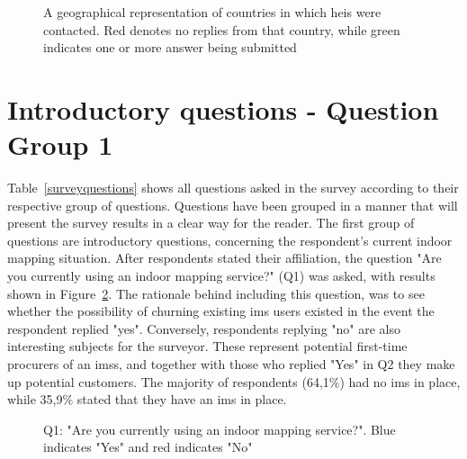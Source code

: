 \begin{figure}
    \centering
    \caption{A geographical representation of countries in which \glspl{hei} were contacted. Red denotes no replies from that country, while green indicates one or more answer being submitted}
    \label{fig:worldmap}
\end{figure}

\section{Introductory questions - Question Group 1}
Table~\ref{surveyquestions} shows all questions asked in the survey according to their respective group of questions. Questions have been grouped in a manner that will present the survey results in a clear way for the reader. The first group of questions are introductory questions, concerning the respondent's current indoor mapping situation. After respondents stated their affiliation, the question "Are you currently using an indoor mapping service?" (Q1) was asked, with results shown in Figure~\ref{fig:q1}. The rationale behind including this question, was to see whether the possibility of churning existing \gls{ims} users existed in the event the respondent replied "yes". Conversely, respondents replying "no" are also interesting subjects for the surveyor. These represent potential first-time procurers of an \glspl{ims}, and together with those who replied "Yes" in Q2 they make up potential customers. The majority of respondents (64,1\%) had no \gls{ims} in place, while 35,9\% stated that they have an \gls{ims} in place. 

\begin{figure}[H]
    \centering
    \caption{Q1: "Are you currently using an indoor mapping service?". Blue indicates "Yes" and red indicates "No"}
    \label{fig:q1}
\end{figure}


